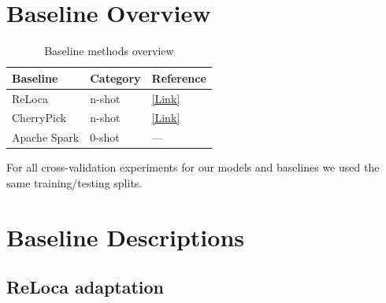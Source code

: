 

\section{Baseline Overview}

\begin{table}[h]
\centering
\begin{tabular}{@{}lll@{}}
\toprule
\textbf{Baseline} & \textbf{Category} & \textbf{Reference} \\
\midrule
ReLoca & n-shot & \href{https://ieeexplore.ieee.org/document/9155521}{[Link]} \\
CherryPick & n-shot & \href{https://www.usenix.org/system/files/conference/nsdi17/nsdi17-alipourfard.pdf}{[Link]} \\
Apache Spark & 0-shot & --- \\
\bottomrule
\end{tabular}
\caption{Baseline methods overview}
\end{table}

For all cross-validation experiments for our models and baselines we used the same training/testing splits.

\section{Baseline Descriptions}

\subsection{ReLoca adaptation}


